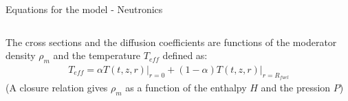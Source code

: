 \begin{frame}{Equations for the model - Neutronics}
\begin{columns}[T]
\begin{column}{5cm}
    \vspace{.5cm}

    The cross sections and the diffusion coefficients are functions of the moderator density $ \rho_{m} $ and the temperature $ T_{eff} $ defined as:
    \begin{align}
      T_{eff} = 
      \alpha \left. T(t,z,r) \right|_{r=0} 
      + (1-\alpha) \left. T(t,z,r) \right|_{r=R_{fuel}} \nonumber
    \end{align}
    (A closure relation gives $ \rho_{m} $ as a function of the enthalpy $ H $ and the pression $ P $)

  \end{column}
  \end{columns}

\end{frame}



